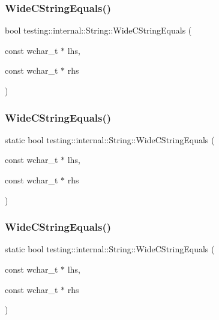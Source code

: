 \subsubsection{\texorpdfstring{WideCStringEquals()}{WideCStringEquals()}\hspace{0.1cm}{\footnotesize\ttfamily [1/3]}}
{\footnotesize\ttfamily bool testing\+::internal\+::\+String\+::\+Wide\+C\+String\+Equals (\begin{DoxyParamCaption}\item[{const wchar\+\_\+t $\ast$}]{lhs,  }\item[{const wchar\+\_\+t $\ast$}]{rhs }\end{DoxyParamCaption})\hspace{0.3cm}{\ttfamily [static]}}

\mbox{\label{classtesting_1_1internal_1_1_string_a4f5e053907ebced07fe0dc52dd2d1e85}} 
\subsubsection{\texorpdfstring{WideCStringEquals()}{WideCStringEquals()}\hspace{0.1cm}{\footnotesize\ttfamily [2/3]}}
{\footnotesize\ttfamily static bool testing\+::internal\+::\+String\+::\+Wide\+C\+String\+Equals (\begin{DoxyParamCaption}\item[{const wchar\+\_\+t $\ast$}]{lhs,  }\item[{const wchar\+\_\+t $\ast$}]{rhs }\end{DoxyParamCaption})\hspace{0.3cm}{\ttfamily [static]}}

\mbox{\label{classtesting_1_1internal_1_1_string_a4f5e053907ebced07fe0dc52dd2d1e85}} 
\subsubsection{\texorpdfstring{WideCStringEquals()}{WideCStringEquals()}\hspace{0.1cm}{\footnotesize\ttfamily [3/3]}}
{\footnotesize\ttfamily static bool testing\+::internal\+::\+String\+::\+Wide\+C\+String\+Equals (\begin{DoxyParamCaption}\item[{const wchar\+\_\+t $\ast$}]{lhs,  }\item[{const wchar\+\_\+t $\ast$}]{rhs }\end{DoxyParamCaption})\hspace{0.3cm}{\ttfamily [static]}}



